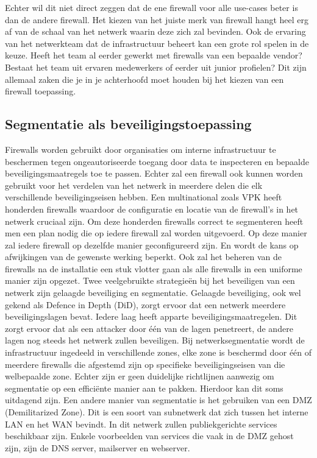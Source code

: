 Echter wil dit niet direct zeggen dat de ene firewall voor alle use-cases beter is dan de andere firewall. Het kiezen van het juiste merk van firewall hangt heel erg af van de schaal van het netwerk waarin deze zich zal bevinden. Ook de ervaring van het netwerkteam dat de infrastructuur beheert kan een grote rol spelen in de keuze. Heeft het team al eerder gewerkt met firewalls van een bepaalde vendor? Bestaat het team uit ervaren medewerkers of eerder uit junior profielen? Dit zijn allemaal zaken die je in je achterhoofd moet houden bij het kiezen van een firewall toepassing.



\subsection{Segmentatie als beveiligingstoepassing}
Firewalls worden gebruikt door organisaties om interne infrastructuur te beschermen tegen ongeautoriseerde toegang door data te inspecteren en bepaalde beveiligingsmaatregels toe te passen. Echter zal een firewall ook kunnen worden gebruikt voor het verdelen van het netwerk in meerdere delen die elk verschillende beveiligingseisen hebben. Een multinational zoals VPK heeft honderden firewalls waardoor de configuratie en locatie van de firewall’s in het netwerk cruciaal zijn. Om deze honderden firewalls correct te segmenteren heeft men een plan nodig die op iedere firewall zal worden uitgevoerd. Op deze manier zal iedere firewall op dezelfde manier geconfigureerd zijn. En wordt de kans op afwijkingen van de gewenste werking beperkt. Ook zal het beheren van de firewalls na de installatie een stuk vlotter gaan als alle firewalls in een uniforme manier zijn opgezet.
Twee veelgebruikte strategieën bij het beveiligen van een netwerk zijn gelaagde beveiliging en segmentatie. Gelaagde beveiliging, ook wel gekend als Defence in Depth (DiD), zorgt ervoor dat een netwerk meerdere beveiligingslagen bevat. Iedere laag heeft apparte beveiligingsmaatregelen. Dit zorgt ervoor dat als een attacker door één van de lagen penetreert, de andere lagen nog steeds het netwerk zullen beveiligen. \autocite{FortinetDE2025} Bij netwerksegmentatie wordt de infrastructuur ingedeeld in verschillende zones, elke zone is beschermd door één of meerdere firewalls die afgestemd zijn op specifieke beveiligingseisen van die welbepaalde zone. Echter zijn er geen duidelijke richtlijnen aanwezig om segmentatie op een efficiënte manier aan te pakken. Hierdoor kan dit soms uitdagend zijn. \autocite{Mhaskar2021}
Een andere manier van segmentatie is het gebruiken van een DMZ (Demilitarized Zone). Dit is een soort van subnetwerk dat zich tussen het interne LAN en het WAN bevindt. In dit netwerk zullen publiekgerichte services beschikbaar zijn. Enkele voorbeelden van services die vaak in de DMZ gehost zijn, zijn de DNS server, mailserver en webserver. \autocite{Patel2020}



